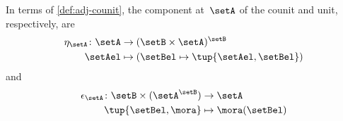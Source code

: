 In terms of \cref{def:adj-counit}, the component at~$\setA$ of the counit and unit, respectively, are
\begin{equation*}
  \begin{aligned}
    \eta_\setA \colon \setA &\to  (\setB \times \setA)^\setB\\
    \setAel &\mapsto (\setBel \mapsto \tup{\setAel,\setBel})
  \end{aligned}
\end{equation*}
and
\begin{equation*}
  \begin{aligned}
    \epsilon_\setA \colon \setB \times (\setA^\setB) &\to \setA\\
    \tup{\setBel,\mora} &\mapsto \mora(\setBel)
  \end{aligned}
\end{equation*}